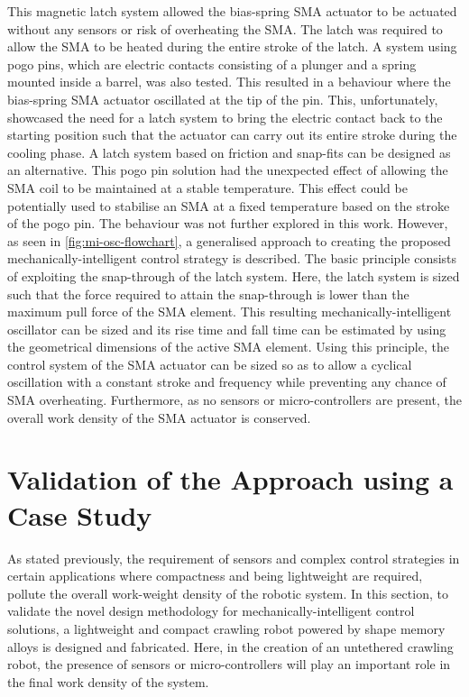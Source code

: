This magnetic latch system allowed the bias-spring SMA actuator to be actuated without any sensors or risk of overheating the SMA. The latch was required to allow the SMA to be heated during the entire stroke of the latch. A system using pogo pins, which are electric contacts consisting of a plunger and a spring mounted inside a barrel, was also tested. This resulted in a behaviour where the bias-spring SMA actuator oscillated at the tip of the pin. This, unfortunately, showcased the need for a latch system to bring the electric contact back to the starting position such that the actuator can carry out its entire stroke during the cooling phase. A latch system based on friction and snap-fits can be designed as an alternative. This pogo pin solution had the unexpected effect of allowing the SMA coil to be maintained at a stable temperature. This effect could be potentially used to stabilise an SMA at a fixed temperature based on the stroke of the pogo pin. The behaviour was not further explored in this work. However, as seen in \cref{fig:mi-osc-flowchart}, a generalised approach to creating the proposed mechanically-intelligent control strategy is described. The basic principle consists of exploiting the snap-through of the latch system. Here, the latch system is sized such that the force required to attain the snap-through is lower than the maximum pull force of the SMA element. This resulting mechanically-intelligent oscillator can be sized and its rise time and fall time can be estimated by using the geometrical dimensions of the active SMA element. Using this principle, the control system of the SMA actuator can be sized so as to allow a cyclical oscillation with a constant stroke and frequency while preventing any chance of SMA overheating. Furthermore, as no sensors or micro-controllers are present, the overall work density of the SMA actuator is conserved.

\section{Validation of the Approach using a Case Study}
As stated previously, the requirement of sensors and complex control strategies in certain applications where compactness and being lightweight are required, pollute the overall work-weight density of the robotic system. In this section, to validate the novel design methodology for mechanically-intelligent control solutions, a lightweight and compact crawling robot powered by shape memory alloys is designed and fabricated. Here, in the creation of an untethered crawling robot, the presence of sensors or micro-controllers will play an important role in the final work density of the system.


